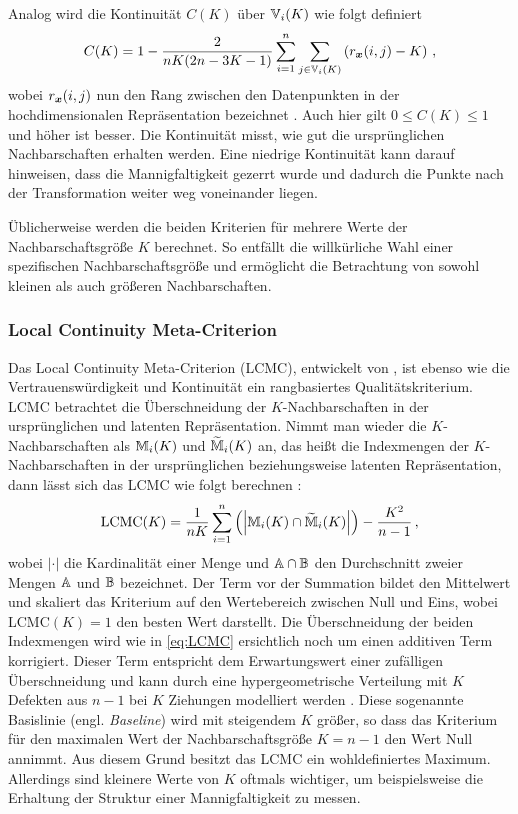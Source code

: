Analog wird die Kontinuität $C(K)$ über $\mathbb{V}_i(K)$ wie folgt definiert
\begin{equation}
	C(K) = 1 - \frac{2}{nK(2n - 3K - 1)} \sum_{i = 1}^{n}\sum_{j \in \mathbb{V}_i(K) } \left( r_{\bm{x}}(i, j) - K \right) \, ,
\end{equation}
wobei $r_{\bm{x}}(i, j)$ nun den Rang zwischen den Datenpunkten in der hochdimensionalen Repräsentation bezeichnet \parencite[487]{Venna.2001}. Auch hier gilt $0 \leq C(K) \leq 1$ und höher ist besser. Die Kontinuität
misst, wie gut die ursprünglichen Nachbarschaften erhalten werden. Eine niedrige Kontinuität kann
darauf hinweisen, dass die Mannigfaltigkeit gezerrt wurde und dadurch die Punkte nach der
Transformation weiter weg voneinander liegen.

Üblicherweise werden die beiden Kriterien für mehrere Werte der Nachbarschaftsgröße $K$ berechnet. So entfällt die willkürliche Wahl einer spezifischen Nachbarschaftsgröße und ermöglicht die Betrachtung von sowohl kleinen als auch größeren Nachbarschaften.

\subsubsection{Local Continuity Meta-Criterion}
\label{ch:Vergleich:sec:Methodik:subsec:Qualitaetskriterien:LCMC}
Das Local Continuity Meta-Criterion (LCMC), entwickelt von \textcite{Chen.2009}, ist ebenso wie die Vertrauenswürdigkeit und Kontinuität ein rangbasiertes Qualitätskriterium. LCMC betrachtet die Überschneidung der $K$-Nachbarschaften in der ursprünglichen und latenten Repräsentation. Nimmt man wieder die $K$-Nachbarschaften als $\mathbb{M}_i(K)$ und $\widetilde{\mathbb{M}}_i(K)$ an, das heißt die Indexmengen der $K$-Nachbarschaften in der ursprünglichen beziehungsweise latenten Repräsentation, dann lässt sich das LCMC wie folgt berechnen \parencite[212]{Chen.2009}:
\begin{equation}
	\label{eq:LCMC}
	\text{LCMC}(K) = \frac{1}{nK} \sum_{i=1}^{n} \left( \left| \mathbb{M}_i(K) \cap \widetilde{\mathbb{M}}_i(K) \right| \right) - \frac{K^2}{n - 1} \,,
\end{equation}
wobei $­|\cdot|$ die Kardinalität einer Menge und $\mathbb{A} \cap \mathbb{B}$ den Durchschnitt zweier Mengen $\mathbb{A}$ und $\mathbb{B}$ bezeichnet. Der Term vor der Summation bildet den Mittelwert und skaliert das Kriterium auf den Wertebereich zwischen Null und Eins, wobei LCMC$(K) = 1$ den besten Wert darstellt. Die Überschneidung der beiden Indexmengen wird wie in \eqref{eq:LCMC} ersichtlich noch um einen additiven Term korrigiert. Dieser Term entspricht dem Erwartungswert einer zufälligen Überschneidung und kann durch eine hypergeometrische Verteilung mit $K$ Defekten aus $n - 1$ bei $K$ Ziehungen modelliert werden \parencite[213]{Chen.2009}. Diese sogenannte Basislinie (engl. \textit{Baseline}) wird mit steigendem
$K$ größer, so dass das Kriterium für den maximalen Wert der Nachbarschaftsgröße $K = n - 1$ den
Wert Null annimmt. Aus diesem Grund besitzt das LCMC ein wohldefiniertes Maximum. Allerdings sind
kleinere Werte von $K$ oftmals wichtiger, um beispielsweise die Erhaltung der Struktur einer
Mannigfaltigkeit zu messen.

